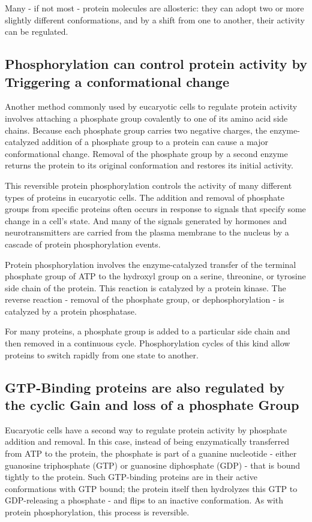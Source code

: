 Many - if not most - protein molecules are allosteric: they can adopt
two or more slightly different conformations, and by a shift from one to
another, their activity can be regulated.

\subsection{Phosphorylation can control protein activity by Triggering a conformational change}

Another method commonly used by eucaryotic cells to regulate protein
activity involves attaching a phosphate group covalently to one of
its amino acid side chains. Because each phosphate group carries two
negative charges, the enzyme-catalyzed addition of a phosphate group
to a protein can cause a major conformational change.
Removal of the phosphate group by a second enzyme returns the protein to its original
conformation and restores its initial activity.

This reversible protein phosphorylation controls the activity of many
different types of proteins in eucaryotic cells.
The addition and removal of phosphate groups from specific proteins
often occurs in response to signals that specify some change in a cell’s
state. And many of the signals generated by hormones and neurotransmitters are
carried from the plasma membrane to the nucleus by a cascade of protein
phosphorylation events.

Protein phosphorylation involves the enzyme-catalyzed transfer of the
terminal phosphate group of ATP to the hydroxyl group on a serine, threonine,
or tyrosine side chain of the protein. This reaction is catalyzed by a
protein kinase. The reverse reaction - removal of the phosphate group,
or dephosphorylation - is catalyzed by a protein phosphatase.

For many proteins, a phosphate group is added to a particular side
chain and then removed in a continuous cycle. Phosphorylation cycles
of this kind allow proteins to switch rapidly from one state to another.

\subsection{GTP-Binding proteins are also regulated by the cyclic Gain and loss of a phosphate Group}

Eucaryotic cells have a second way to regulate protein activity by phosphate
addition and removal. In this case, instead of being enzymatically
transferred from ATP to the protein, the phosphate is part of a guanine
nucleotide - either guanosine triphosphate (GTP) or guanosine diphosphate
(GDP) - that is bound tightly to the protein. Such GTP-binding
proteins are in their active conformations with GTP bound; the protein
itself then hydrolyzes this GTP to GDP-releasing a phosphate - and flips
to an inactive conformation. As with protein phosphorylation, this process is reversible.


